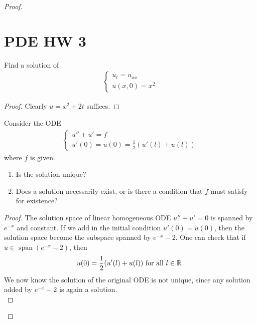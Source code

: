 \documentclass{report}
\begin{document}
\begin{proof}
\section{PDE HW 3}
\begin{question}{}{}
Find a solution of 
\begin{align*}
\begin{cases}
  u_t=u_{xx}\\
  u(x,0)=x^2
\end{cases}
\end{align*}
\end{question}
\begin{proof}
Clearly $u=x^2+2t$ suffices.
\end{proof}
\begin{question}{}{}
Consider the ODE 
\begin{align*}
\begin{cases}
  u''+u'=f \\
  u'(0)=u(0)=\frac{1}{2}(u'(l)+u(l))
\end{cases}
\end{align*}
where $f$ is given. 
\begin{enumerate}[label=(\alph*)]
  \item Is the solution unique? 
  \item Does a solution necessarily exist, or is there a condition that $f$ must satisfy for existence? 
\end{enumerate}
\end{question}
\begin{proof}
The solution space of linear homogeneous ODE $u''+u'=0$  is spanned by $e^{-x}$ and constant. If we add in the initial condition  $u'(0)=u(0)$, then the solution space become the subspace spanned by $e^{-x}-2$. One can check that if $u \in\operatorname{span}(e^{-x}-2)$, then 
\begin{align*}
u(0)=\frac{1}{2}(u'(l)+u(l))\text{ for all $l\in\mathbb{R}$ }
\end{align*}
We now know the solution of the original ODE is not unique, since any solution added by $e^{-x}-2$ is again a solution. \\


\end{proof}
\end{proof}
\end{document}
